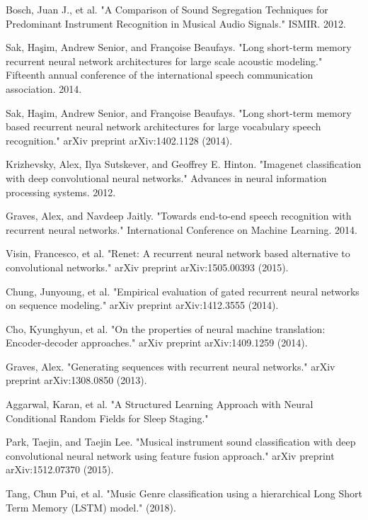 \documentclass[letterpaper, 12 pt, conference]{ieeeconf}  %
\begin{document}
\begin{thebibliography}{99}

 Bosch, Juan J., et al. "A Comparison of Sound Segregation Techniques for Predominant Instrument Recognition in Musical Audio Signals." ISMIR. 2012.

 Sak, Haşim, Andrew Senior, and Françoise Beaufays. "Long short-term memory recurrent neural network architectures for large scale acoustic modeling." Fifteenth annual conference of the international speech communication association. 2014.

 Sak, Haşim, Andrew Senior, and Françoise Beaufays. "Long short-term memory based recurrent neural network architectures for large vocabulary speech recognition." arXiv preprint arXiv:1402.1128 (2014).

 Krizhevsky, Alex, Ilya Sutskever, and Geoffrey E. Hinton. "Imagenet classification with deep convolutional neural networks." Advances in neural information processing systems. 2012.

 Graves, Alex, and Navdeep Jaitly. "Towards end-to-end speech recognition with recurrent neural networks." International Conference on Machine Learning. 2014.

 Visin, Francesco, et al. "Renet: A recurrent neural network based alternative to convolutional networks." arXiv preprint arXiv:1505.00393 (2015).

 Chung, Junyoung, et al. "Empirical evaluation of gated recurrent neural networks on sequence modeling." arXiv preprint arXiv:1412.3555 (2014).

 Cho, Kyunghyun, et al. "On the properties of neural machine translation: Encoder-decoder approaches." arXiv preprint arXiv:1409.1259 (2014).

 Graves, Alex. "Generating sequences with recurrent neural networks." arXiv preprint arXiv:1308.0850 (2013).

 Aggarwal, Karan, et al. "A Structured Learning Approach with Neural Conditional Random Fields for Sleep Staging."

 Park, Taejin, and Taejin Lee. "Musical instrument sound classification with deep convolutional neural network using feature fusion approach." arXiv preprint arXiv:1512.07370 (2015).

 Tang, Chun Pui, et al. "Music Genre classification using a hierarchical Long Short Term Memory (LSTM) model." (2018).


\end{thebibliography}
\end{document}
